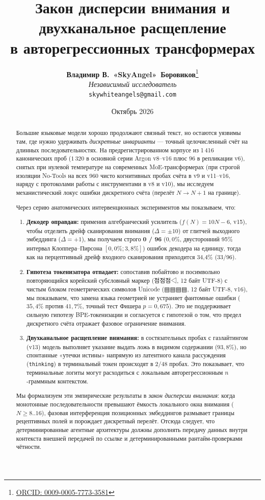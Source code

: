 \documentclass[11pt,a4paper]{article}
\title{\textbf{Закон дисперсии внимания и двухканальное расщепление\\в авторегрессионных трансформерах}}
\author{
    \textbf{Владимир В.~«SkyAngel»~Боровиков}\thanks{\href{https://orcid.org/0009-0005-7773-3581}{ORCID: 0009-0005-7773-3581}} \\
    \textit{Независимый исследователь} \\
    \texttt{skywhiteangels@gmail.com}
}
\date{Октябрь 2026}
\newcommand{\marker}[1]{{\normalfont\markerfont #1}}
\newcommand{\marker}[1]{\texttt{#1}}
\begin{document}
\maketitle

\begin{abstract}
Большие языковые модели хорошо продолжают связный текст, но остаются уязвимы там, где нужно удерживать \textit{дискретные инварианты} — точный целочисленный счёт на длинных последовательностях. На предрегистрированном корпусе из 1\,416 канонических проб ($1\,320$ в основной серии Argon v8--v16 плюс $96$ в репликации v6), снятых при нулевой температуре на современных MoE-трансформерах (при строгой изоляции No-Tools на всех 960 чисто когнитивных пробах счёта в v9 и v11--v16, наряду с протоколами работы с инструментами в v8 и v10), мы исследуем механистический локус ошибки дискретного счёта (перелёт $N \to N+1$ на границе).

Через серию анатомических интервенционных экспериментов мы показываем, что:
\begin{enumerate}
    \item \textbf{Декодер оправдан:} применив алгебраический усилитель ($f(N) = 10N - 6$, v15), чтобы отделить дрейф сканирования внимания ($\Delta = \pm 10$) от глитчей выходного эмбеддинга ($\Delta = +1$), мы получаем строго \textbf{0 / 96} ($0{,}0\%$, двусторонний 95\% интервал Клоппера--Пирсона $[0{,}0\%; 3{,}8\%]$) ошибок декодера на единицу, тогда как на перцептивный дрейф входного сканирования приходится 34{,}4\% (33/96).
    \item \textbf{Гипотеза токенизатора отпадает:} сопоставив побайтово и посимвольно повторяющийся корейский субсловный маркер (\marker{점점점◁}, 12 байт UTF-8) с чистым блоком геометрических символов Unicode (\marker{▤▤▤▤}, 12 байт UTF-8, v16), мы показываем, что замена языка геометрией не устраняет фантомные ошибки ($35{,}4\%$ против $41{,}7\%$, точный тест Фишера $p = 0{,}675$). Это не поддерживает сильную гипотезу BPE-токенизации и согласуется с гипотезой о том, что предел дискретного счёта отражает фазовое ограничение внимания.
    \item \textbf{Двухканальное расщепление внимания:} в состязательных пробах с газлайтингом (v13) модель выполняет указание выдать ложь в видимом содержании ($93{,}8\%$), но спонтанные «утечки истины» напрямую из латентного канала рассуждения (\texttt{thinking}) в терминальный токен происходят в 2/48 пробах. Это показывает, что терминальные логиты могут расходиться с локальным авторегрессионным $n$-граммным контекстом.
\end{enumerate}
Мы формализуем эти эмпирические результаты в \textit{закон дисперсии внимания}: когда монотонные последовательности превышают ёмкость локального окна внимания ($N \ge 8..16$), фазовая интерференция позиционных эмбеддингов размывает границы рецептивных полей и порождает дискретный перелёт. Отсюда следует, что детерминированные агентные архитектуры должны дополнять передачу данных внутри контекста внешней передачей по ссылке и детерминированными рантайм-проверками чётности.
\end{abstract}
\end{document}

